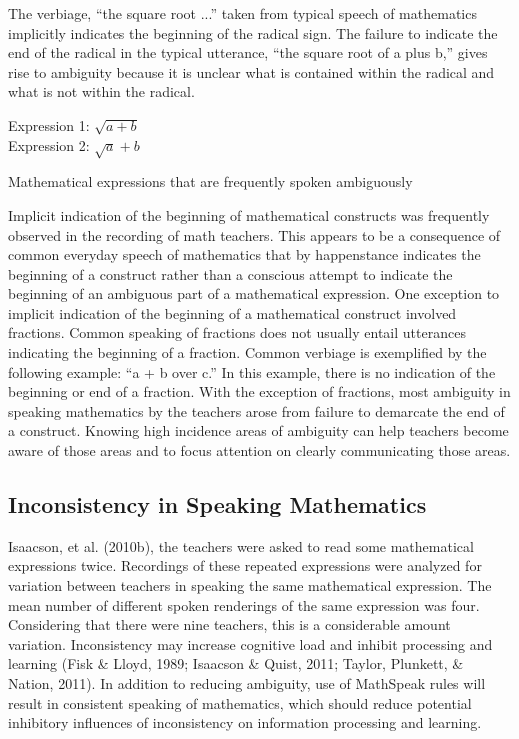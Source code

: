 \documentclass[11.5pt]{sig-alternate} %
\begin{document}
\begin{large}
The verbiage, “the square root ...” taken from typical speech of mathematics implicitly indicates the beginning of the radical sign. The failure to indicate the end of the radical in the typical utterance, “the square root of a plus b,” gives rise to ambiguity because it is unclear what is contained within the radical and what is not within the radical.\\

\begin{table}[h]
\begin{large}
Expression 1: $\boxed{\sqrt{a+b}}$ \\
Expression 2: $\boxed{\sqrt{a}+b}$
\end{large}
\caption{Mathematical expressions that are frequently spoken ambiguously}
\end{table}

Implicit indication of the beginning of mathematical constructs was frequently observed in the recording of math teachers. This appears to be a consequence of common everyday speech of mathematics that by happenstance indicates the beginning of a construct rather than a conscious attempt to indicate the beginning of an ambiguous part of a mathematical expression. One exception to implicit indication of the beginning of a mathematical construct involved fractions. Common speaking of fractions does not usually entail utterances indicating the beginning of a fraction. Common verbiage is exemplified by the following example: “a + b over c.” In this example, there is no indication of the beginning or end of a fraction. With the exception of fractions, most ambiguity in speaking mathematics by the teachers arose from failure to demarcate the end of a construct. Knowing high incidence areas of ambiguity can help teachers become aware of those areas and to focus attention on clearly communicating those areas.
\raggedbottom

\subsection*{Inconsistency in Speaking Mathematics}
Isaacson, et al. (2010b), the teachers were asked to read some mathematical expressions twice. Recordings of these repeated expressions were analyzed for variation between teachers in speaking the same mathematical expression. The mean number of different spoken renderings of the same expression was four. Considering that there were nine teachers, this is a considerable amount variation. Inconsistency  may increase cognitive load and inhibit processing and learning (Fisk \& Lloyd, 1989; Isaacson \& Quist, 2011; Taylor, Plunkett, \& Nation, 2011). In addition to reducing ambiguity, use of MathSpeak rules will result in consistent speaking of mathematics, which should reduce potential inhibitory influences of inconsistency on information processing and learning.


\end{large}
\end{document}
